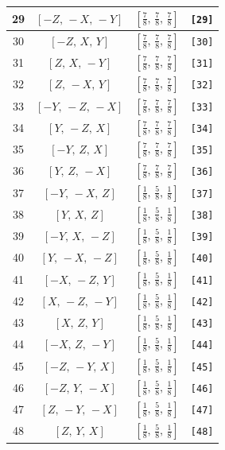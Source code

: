\documentclass[fleqn,8pt]{jsarticle}
\begin{document}
\begin{longtable}{cccc}
29 & $\left[ - Z,\, - X,\, - Y \right]$ & $\left[ \frac{7}{8},\, \frac{7}{8},\, \frac{7}{8} \right]$ & {\tt [29]} \\ \hline
30 & $\left[ - Z,\, X,\, Y \right]$ & $\left[ \frac{7}{8},\, \frac{7}{8},\, \frac{7}{8} \right]$ & {\tt [30]} \\ \hline
31 & $\left[ Z,\, X,\, - Y \right]$ & $\left[ \frac{7}{8},\, \frac{7}{8},\, \frac{7}{8} \right]$ & {\tt [31]} \\ \hline
32 & $\left[ Z,\, - X,\, Y \right]$ & $\left[ \frac{7}{8},\, \frac{7}{8},\, \frac{7}{8} \right]$ & {\tt [32]} \\ \hline
33 & $\left[ - Y,\, - Z,\, - X \right]$ & $\left[ \frac{7}{8},\, \frac{7}{8},\, \frac{7}{8} \right]$ & {\tt [33]} \\ \hline
34 & $\left[ Y,\, - Z,\, X \right]$ & $\left[ \frac{7}{8},\, \frac{7}{8},\, \frac{7}{8} \right]$ & {\tt [34]} \\ \hline
35 & $\left[ - Y,\, Z,\, X \right]$ & $\left[ \frac{7}{8},\, \frac{7}{8},\, \frac{7}{8} \right]$ & {\tt [35]} \\ \hline
36 & $\left[ Y,\, Z,\, - X \right]$ & $\left[ \frac{7}{8},\, \frac{7}{8},\, \frac{7}{8} \right]$ & {\tt [36]} \\ \hline
37 & $\left[ - Y,\, - X,\, Z \right]$ & $\left[ \frac{1}{8},\, \frac{5}{8},\, \frac{1}{8} \right]$ & {\tt [37]} \\ \hline
38 & $\left[ Y,\, X,\, Z \right]$ & $\left[ \frac{1}{8},\, \frac{5}{8},\, \frac{1}{8} \right]$ & {\tt [38]} \\ \hline
39 & $\left[ - Y,\, X,\, - Z \right]$ & $\left[ \frac{1}{8},\, \frac{5}{8},\, \frac{1}{8} \right]$ & {\tt [39]} \\ \hline
40 & $\left[ Y,\, - X,\, - Z \right]$ & $\left[ \frac{1}{8},\, \frac{5}{8},\, \frac{1}{8} \right]$ & {\tt [40]} \\ \hline
41 & $\left[ - X,\, - Z,\, Y \right]$ & $\left[ \frac{1}{8},\, \frac{5}{8},\, \frac{1}{8} \right]$ & {\tt [41]} \\ \hline
42 & $\left[ X,\, - Z,\, - Y \right]$ & $\left[ \frac{1}{8},\, \frac{5}{8},\, \frac{1}{8} \right]$ & {\tt [42]} \\ \hline
43 & $\left[ X,\, Z,\, Y \right]$ & $\left[ \frac{1}{8},\, \frac{5}{8},\, \frac{1}{8} \right]$ & {\tt [43]} \\ \hline
44 & $\left[ - X,\, Z,\, - Y \right]$ & $\left[ \frac{1}{8},\, \frac{5}{8},\, \frac{1}{8} \right]$ & {\tt [44]} \\ \hline
45 & $\left[ - Z,\, - Y,\, X \right]$ & $\left[ \frac{1}{8},\, \frac{5}{8},\, \frac{1}{8} \right]$ & {\tt [45]} \\ \hline
46 & $\left[ - Z,\, Y,\, - X \right]$ & $\left[ \frac{1}{8},\, \frac{5}{8},\, \frac{1}{8} \right]$ & {\tt [46]} \\ \hline
47 & $\left[ Z,\, - Y,\, - X \right]$ & $\left[ \frac{1}{8},\, \frac{5}{8},\, \frac{1}{8} \right]$ & {\tt [47]} \\ \hline
48 & $\left[ Z,\, Y,\, X \right]$ & $\left[ \frac{1}{8},\, \frac{5}{8},\, \frac{1}{8} \right]$ & {\tt [48]} \\
\end{longtable}
\end{document}
